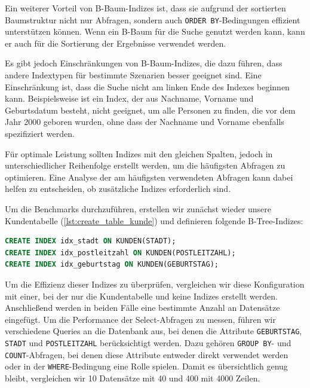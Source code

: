 Ein weiterer Vorteil von B-Baum-Indizes ist, dass sie aufgrund der sortierten Baumstruktur nicht nur Abfragen, sondern auch \texttt{ORDER BY}-Bedingungen effizient unterstützen können.
Wenn ein B-Baum für die Suche genutzt werden kann, kann er auch für die Sortierung der Ergebnisse verwendet werden.

Es gibt jedoch Einschränkungen von B-Baum-Indizes, die dazu führen, dass andere Indextypen für bestimmte Szenarien besser geeignet sind.
Eine Einschränkung ist, dass die Suche nicht am linken Ende des Indexes beginnen kann.
Beispielsweise ist ein Index, der aus Nachname, Vorname und Geburtsdatum besteht, nicht geeignet, um alle Personen zu finden, die vor dem Jahr 2000 geboren wurden, ohne dass der Nachname und Vorname ebenfalls spezifiziert werden.

Für optimale Leistung sollten Indizes mit den gleichen Spalten, jedoch in unterschiedlicher Reihenfolge erstellt werden, um die häufigsten Abfragen zu optimieren.
Eine Analyse der am häufigsten verwendeten Abfragen kann dabei helfen zu entscheiden, ob zusätzliche Indizes erforderlich sind.

Um die Benchmarks durchzuführen, erstellen wir zunächst wieder unsere Kundentabelle (\ref{lst:create_table_kunde}) und definieren folgende B-Tree-Indizes:

\vspace{-5pt}
\begin{lstlisting}[language=SQL,caption=Definition mehrere Indizes,label={lst:indexing-create-multiple}]
CREATE INDEX idx_stadt ON KUNDEN(STADT);
CREATE INDEX idx_postleitzahl ON KUNDEN(POSTLEITZAHL);
CREATE INDEX idx_geburtstag ON KUNDEN(GEBURTSTAG);
\end{lstlisting}
\vspace{-5pt}

Um die Effizienz dieser Indizes zu überprüfen, vergleichen wir diese Konfiguration mit einer, bei der nur die Kundentabelle und keine Indizes erstellt werden.
Anschließend werden in beiden Fälle eine bestimmte Anzahl an Datensätze eingefügt.
Um die Performance der Select-Abfragen zu messen, führen wir verschiedene Queries an die Datenbank aus, bei denen die Attribute \texttt{GEBURTSTAG}, \texttt{STADT} und \texttt{POSTLEITZAHL} berücksichtigt werden.
Dazu gehören \texttt{GROUP BY}- und \texttt{COUNT}-Abfragen, bei denen diese Attribute entweder direkt verwendet werden oder in der \texttt{WHERE}-Bedingung eine Rolle spielen.
Damit es übersichtlich genug bleibt, vergleichen wir 10 Datensätze mit 40 und 400 mit 4000 Zeilen.

